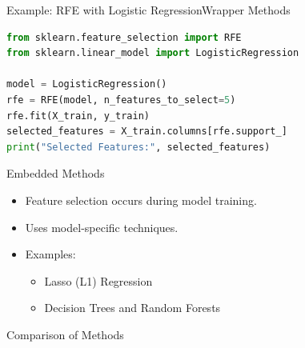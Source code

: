 \documentclass[11pt]{beamer}
\begin{document}
\begin{frame}[fragile]{Example: RFE with Logistic Regression}{Wrapper Methods}
    \begin{lstlisting}[language=Python]
from sklearn.feature_selection import RFE
from sklearn.linear_model import LogisticRegression

model = LogisticRegression()
rfe = RFE(model, n_features_to_select=5)
rfe.fit(X_train, y_train)
selected_features = X_train.columns[rfe.support_]
print("Selected Features:", selected_features)
    \end{lstlisting}
\end{frame}
\begin{frame}{Embedded Methods}
    \begin{itemize}
        \item Feature selection occurs during model training.
        \item Uses model-specific techniques.
        \item Examples:
        \begin{itemize}
            \item Lasso (L1) Regression
            \item Decision Trees and Random Forests
        \end{itemize}
    \end{itemize}
\end{frame}
\begin{frame}{Comparison of Methods}
\end{frame}
\end{document}
